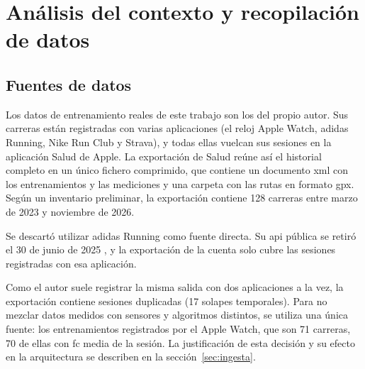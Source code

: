 \chapter{Análisis del contexto y recopilación de datos}
\label{ch:analisis_datos}


\section{Fuentes de datos}
\label{sec:fuentes}

Los datos de entrenamiento reales de este trabajo son los del propio autor. Sus carreras están registradas con varias aplicaciones (el reloj Apple Watch, adidas Running, Nike Run Club y Strava), y todas ellas vuelcan sus sesiones en la aplicación Salud de Apple. La exportación de Salud reúne así el historial completo en un único fichero comprimido, que contiene un documento \gls{xml} con los entrenamientos y las mediciones y una carpeta con las rutas en formato \gls{gpx}. Según un inventario preliminar, la exportación contiene 128 carreras entre marzo de 2023 y noviembre de 2026.

Se descartó utilizar adidas Running como fuente directa. Su \gls{api} pública se retiró el 30 de junio de 2025 \cite{runalyze2025changelog}, y la exportación de la cuenta solo cubre las sesiones registradas con esa aplicación.

Como el autor suele registrar la misma salida con dos aplicaciones a la vez, la exportación contiene sesiones duplicadas (17 solapes temporales). Para no mezclar datos medidos con sensores y algoritmos distintos, se utiliza una única fuente: los entrenamientos registrados por el Apple Watch, que son 71 carreras, 70 de ellas con \gls{fc} media de la sesión. La justificación de esta decisión y su efecto en la arquitectura se describen en la sección~\ref{sec:ingesta}.


